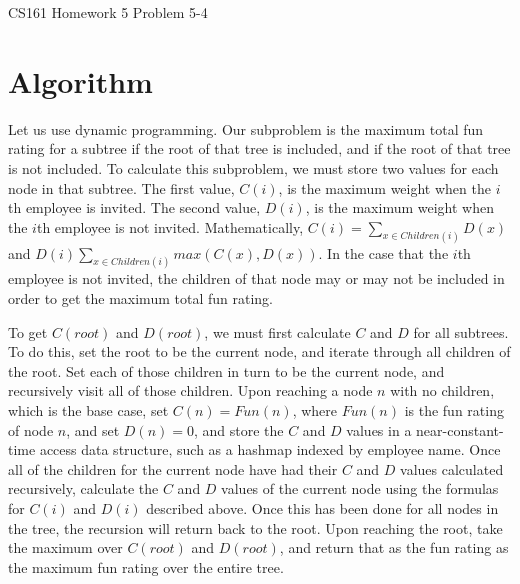 \documentclass[12pt]{article}
\begin{document}
\begin{center}
{\Large CS161 Homework 5 Problem 5-4}

\end{center}

\section*{Algorithm}
Let us use dynamic programming. Our subproblem is the maximum total fun rating for a subtree if the root of that tree is included, and if the root of that tree is not included. To calculate this subproblem, we must store two values for each node in that subtree. The first value, $C(i)$, is the maximum weight when the $i$th employee is invited. The second value, $D(i)$, is the maximum weight when the $i$th employee is not invited. Mathematically, $C(i) = \sum_{x \in Children(i)} D(x)$ and $D(i) \sum_{x \in Children(i)} max(C(x), D(x))$. In the case that the $i$th employee is not invited, the children of that node may or may not be included in order to get the maximum total fun rating. 

To get $C(root)$ and $D(root)$, we must first calculate $C$ and $D$ for all subtrees. To do this, set the root to be the current node, and iterate through all children of the root. Set each of those children in turn to be the current node, and recursively visit all of those children. Upon reaching a node $n$ with no children, which is the base case, set $C(n) = Fun(n)$, where $Fun(n)$ is the fun rating of node $n$, and set $D(n) = 0$, and store the $C$ and $D$ values in a near-constant-time access data structure, such as a hashmap indexed by employee name. Once all of the children for the current node have had their $C$ and $D$ values calculated recursively, calculate the $C$ and $D$ values of the current node using the formulas for $C(i)$ and $D(i)$ described above. Once this has been done for all nodes in the tree, the recursion will return back to the root. Upon reaching the root, take the maximum over $C(root)$ and $D(root)$, and return that as the fun rating as the maximum fun rating over the entire tree.
\end{document}
